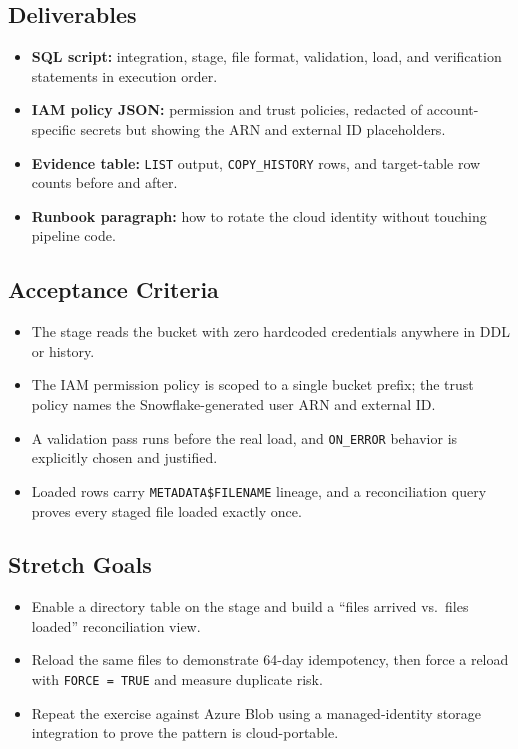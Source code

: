 \subsection*{Deliverables}
\begin{itemize}
    \item \textbf{SQL script:} integration, stage, file format, validation, load, and verification statements in execution order.
    \item \textbf{IAM policy JSON:} permission and trust policies, redacted of account-specific secrets but showing the ARN and external ID placeholders.
    \item \textbf{Evidence table:} \texttt{LIST} output, \texttt{COPY\_HISTORY} rows, and target-table row counts before and after.
    \item \textbf{Runbook paragraph:} how to rotate the cloud identity without touching pipeline code.
\end{itemize}

\subsection*{Acceptance Criteria}
\begin{itemize}
    \item The stage reads the bucket with zero hardcoded credentials anywhere in DDL or history.
    \item The IAM permission policy is scoped to a single bucket prefix; the trust policy names the Snowflake-generated user ARN and external ID.
    \item A validation pass runs before the real load, and \texttt{ON\_ERROR} behavior is explicitly chosen and justified.
    \item Loaded rows carry \texttt{METADATA\$FILENAME} lineage, and a reconciliation query proves every staged file loaded exactly once.
\end{itemize}

\subsection*{Stretch Goals}
\begin{itemize}
    \item Enable a directory table on the stage and build a ``files arrived vs.\ files loaded'' reconciliation view.
    \item Reload the same files to demonstrate 64-day idempotency, then force a reload with \texttt{FORCE = TRUE} and measure duplicate risk.
    \item Repeat the exercise against Azure Blob using a managed-identity storage integration to prove the pattern is cloud-portable.
\end{itemize}

